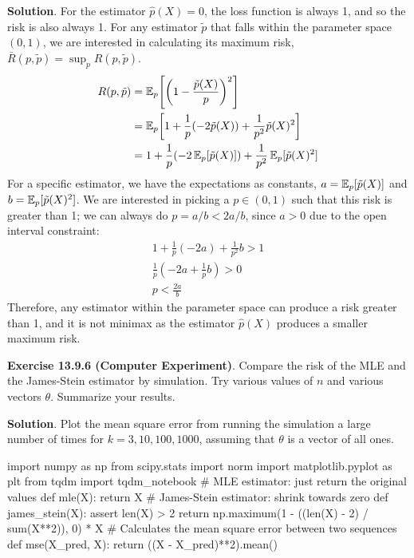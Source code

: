 \textbf{Solution}.
For the estimator \(\hat{p}(X) = 0\), the loss function is always 1, and
so the risk is also always 1.
For any estimator \(\tilde{p}\) that falls within the parameter space
\((0, 1)\), we are interested in calculating its maximum risk,
\(\bar{R}(p, \tilde{p}) = \sup_p R(p, \tilde{p})\).
\begin{align*}
R(p, \tilde{p}) &= \EXP_p \left[\left(1 - \frac{\tilde{p}(X)}{p} \right)^{2}\right]\\
&=\EXP_p \left[1 + \frac{1}{p} (-2 \tilde{p}(X)) + \frac{1}{p^{2}} \tilde{p}(X)^{2} \right] \\
&= 1 + \frac{1}{p} (-2 \EXP_p[\tilde{p}(X)]) + \frac{1}{p^{2}} \EXP_p[\tilde{p}(X)^{2}]
\end{align*}
For a specific estimator, we have the expectations as constants,
\(a = \operatorname{\mathbb{E}}_p[\tilde{p}(X)]\) and
\(b = \operatorname{\mathbb{E}}_p[\tilde{p}(X)^{2}]\). We are interested in picking a
\(p \in (0, 1)\) such that this risk is greater than 1; we can always do
\(p = a / b < 2a / b\), since \(a > 0\) due to the open interval
constraint:
\begin{align*}
1 + \frac{1}{p} (-2a) + \frac{1}{p^{2}} b > 1 \\
\frac{1}{p} \left(-2a + \frac{1}{p} b \right) > 0 \\
p < \frac{2a}{b}
\end{align*}
Therefore, any estimator within the parameter space can produce a risk
greater than 1, and it is not minimax as the estimator \(\hat{p}(X)\)
produces a smaller maximum risk.

\textbf{Exercise 13.9.6 (Computer Experiment)}. Compare the risk of the
MLE and the James-Stein estimator by simulation. Try various values of
\(n\) and various vectors \(\theta\). Summarize your results.

\textbf{Solution}.
Plot the mean square error from running the simulation a large
number of times for \(k = 3, 10, 100, 1000\), assuming that \(\theta\)
is a vector of all ones.

\begin{python}
import numpy as np
from scipy.stats import norm
import matplotlib.pyplot as plt
from tqdm import tqdm_notebook
# MLE estimator: just return the original values
def mle(X):
    return X
# James-Stein estimator: shrink towards zero
def james_stein(X):
    assert len(X) > 2
    return np.maximum(1 - ((len(X) - 2) / sum(X**2)), 0) * X
# Calculates the mean square error between two sequences
def mse(X_pred, X):
    return ((X - X_pred)**2).mean()
\end{python}

